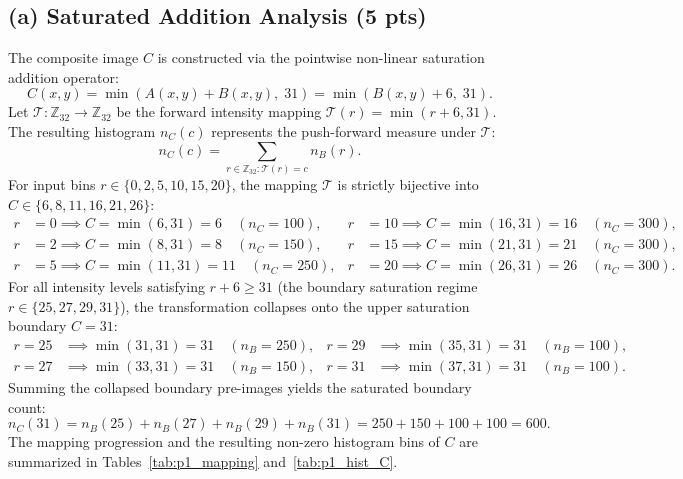 \documentclass[11pt,a4paper]{article}
\begin{document}
\subsection{(a) Saturated Addition Analysis (5 pts)}
The composite image $C$ is constructed via the pointwise non-linear saturation addition operator:
\begin{equation}
C(x, y) = \min\left( A(x, y) + B(x, y), \; 31 \right) = \min\left( B(x, y) + 6, \; 31 \right).
\end{equation}
Let $\mathcal{T}: \mathbb{Z}_{32} \to \mathbb{Z}_{32}$ be the forward intensity mapping $\mathcal{T}(r) = \min(r + 6, 31)$. The resulting histogram $n_C(c)$ represents the push-forward measure under $\mathcal{T}$:
\begin{equation}
n_C(c) = \sum_{r \in \mathbb{Z}_{32} : \mathcal{T}(r) = c} n_B(r).
\end{equation}
For input bins $r \in \{0, 2, 5, 10, 15, 20\}$, the mapping $\mathcal{T}$ is strictly bijective into $C \in \{6, 8, 11, 16, 21, 26\}$:
\begin{align*}
r &= 0 \implies C = \min(6, 31) = 6 \quad (n_C = 100), & r &= 10 \implies C = \min(16, 31) = 16 \quad (n_C = 300), \\
r &= 2 \implies C = \min(8, 31) = 8 \quad (n_C = 150), & r &= 15 \implies C = \min(21, 31) = 21 \quad (n_C = 300), \\
r &= 5 \implies C = \min(11, 31) = 11 \quad (n_C = 250), & r &= 20 \implies C = \min(26, 31) = 26 \quad (n_C = 300).
\end{align*}
For all intensity levels satisfying $r + 6 \ge 31$ (the boundary saturation regime $r \in \{25, 27, 29, 31\}$), the transformation collapses onto the upper saturation boundary $C = 31$:
\begin{align*}
r = 25 &\implies \min(31, 31) = 31 \quad (n_B = 250), & r = 29 &\implies \min(35, 31) = 31 \quad (n_B = 100), \\
r = 27 &\implies \min(33, 31) = 31 \quad (n_B = 150), & r = 31 &\implies \min(37, 31) = 31 \quad (n_B = 100).
\end{align*}
Summing the collapsed boundary pre-images yields the saturated boundary count:
\begin{equation}
n_C(31) = n_B(25) + n_B(27) + n_B(29) + n_B(31) = 250 + 150 + 100 + 100 = 600.
\end{equation}
The mapping progression and the resulting non-zero histogram bins of $C$ are summarized in Tables~\ref{tab:p1_mapping} and~\ref{tab:p1_hist_C}.
\end{document}
